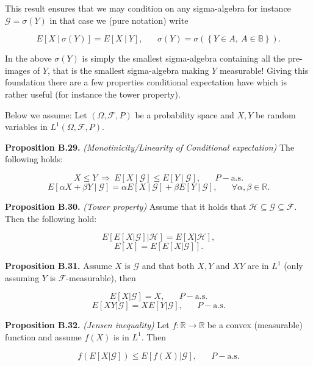 \documentclass[
]{article}
\begin{document}
This result ensures that we may condition on any sigma-algebra for
instance \(\mathcal{G}=\sigma(Y)\) in that case we (pure notation) write

\[
E[X\ \vert\ \sigma(Y)]=E[X\ \vert\ Y],\hspace{20pt}\sigma(Y)=\sigma\left(\left\{ Y\in A,\ A\in\mathbb{B}\right\}\right).
\]

In the above \(\sigma(Y)\) is simply the smallest sigma-algebra
containing all the pre-images of \(Y\), that is the smallest
sigma-algebra making \(Y\) measurable! Giving this foundation there are
a few properties conditional expectation have which is rather useful
(for instance the tower property).

Below we assume: Let \((\Omega,\mathcal{F},P)\) be a probability space
and \(X,Y\) be random variables in \(L^1(\Omega,\mathcal{F},P)\).

\textbf{Proposition B.29.} \emph{(Monotinicity/Linearity of Conditional
expectation)} The following holds:

\[X\le Y\ \Rightarrow\ E[X\ \vert\ \mathcal{G}]\le E[Y\ \vert\ \mathcal{G}],\hspace{20pt}P-\text{a.s.}\]
\[E[\alpha X + \beta Y\ \vert\ \mathcal{G}]=\alpha E[X\ \vert\ \mathcal{G}]+ \beta E[Y\ \vert\ \mathcal{G}],\hspace{20pt}\forall \alpha,\beta\in\mathbb{R}.\]

\textbf{Proposition B.30.} \emph{(Tower property)} Assume that it holds
that \(\mathcal{H}\subseteq\mathcal{G}\subseteq\mathcal{F}\). Then the
following hold:

\[E[E[X\vert \mathcal{G}]\vert\mathcal{H}]=E[X\vert \mathcal{H}],\]
\[E[X]=E[E[X\vert \mathcal{G}]].\]

\textbf{Proposition B.31.} Assume \(X\) is \(\mathcal{G}\) and that both
\(X,Y\) and \(XY\) are in \(L^1\) (only assuming \(Y\) is
\(\mathcal{F}\)-measurable), then

\[E[X\vert\mathcal{G}]=X,\hspace{20pt}P-\text{a.s.}\]
\[E[XY\vert\mathcal{G}]=XE[Y\vert\mathcal{G}],\hspace{20pt}P-\text{a.s.}\]

\textbf{Proposition B.32.} \emph{(Jensen inequality)} Let
\(f:\mathbb{R}\to\mathbb{R}\) be a convex (measurable) function and
assume \(f(X)\) is in \(L^1\). Then

\[f(E[X\vert\mathcal{G}])\le E[f(X)\vert\mathcal{G}],\hspace{20pt}P-\text{a.s.}\]
\end{document}
